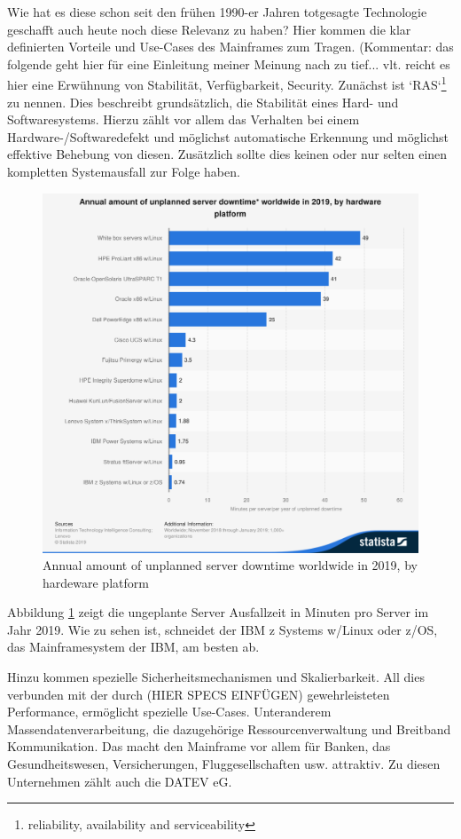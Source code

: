 Wie hat es diese schon seit den frühen 1990-er Jahren totgesagte Technologie geschafft auch heute noch diese Relevanz zu haben?
Hier kommen die klar definierten Vorteile und Use-Cases des Mainframes zum Tragen.
(Kommentar: das folgende geht hier für eine Einleitung meiner Meinung nach zu tief... vlt. reicht es hier eine Erwühnung von Stabilität, Verfügbarkeit, Security. 
Zunächst ist `RAS`\footnote{reliability, availability and serviceability} zu nennen.
Dies beschreibt grundsätzlich, die Stabilität eines Hard- und Softwaresystems.
Hierzu zählt vor allem das Verhalten bei einem Hardware-/Softwaredefekt und möglichst automatische Erkennung und möglichst effektive Behebung von diesen.
Zusätzlich sollte dies keinen oder nur selten einen kompletten Systemausfall zur Folge haben.
\begin{figure}[h]
	\centering
	\includegraphics[width=\textwidth]{figures/statistic_id515285_unplanned-server-downtime-globally-2019-by-hardware-platform.png}
	\caption{Annual amount of unplanned server downtime worldwide in 2019, by hardeware platform}
	\label{fig:serverdowntime}
\end{figure}
Abbildung \ref{fig:serverdowntime} zeigt die ungeplante Server Ausfallzeit in Minuten pro Server im Jahr 2019.
Wie zu sehen ist, schneidet der IBM z Systems w/Linux oder z/OS, das Mainframesystem der IBM, am besten ab.


Hinzu kommen spezielle Sicherheitsmechanismen und Skalierbarkeit.
All dies verbunden mit der durch (HIER SPECS EINFÜGEN) gewehrleisteten Performance, ermöglicht spezielle Use-Cases.
Unteranderem Massendatenverarbeitung, die dazugehörige Ressourcenverwaltung und Breitband Kommunikation.
Das macht den Mainframe vor allem für Banken, das Gesundheitswesen, Versicherungen, Fluggesellschaften usw. attraktiv.
Zu diesen Unternehmen zählt auch die DATEV eG.
\cite{IBM.2014}

